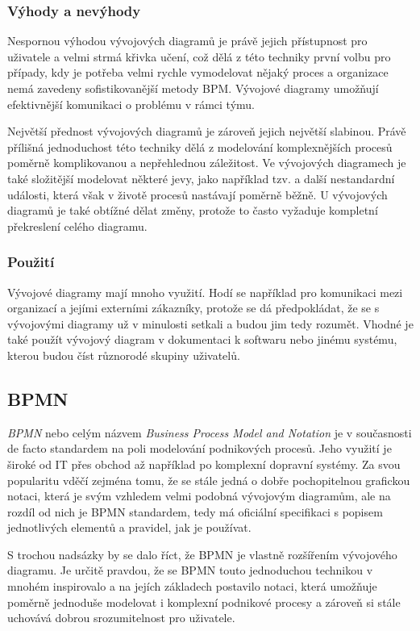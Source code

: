 \subsubsection{Výhody a nevýhody}
Nespornou výhodou vývojových diagramů je právě jejich přístupnost pro uživatele a velmi strmá křivka učení, což dělá z této techniky první volbu pro případy, kdy je potřeba velmi rychle vymodelovat nějaký proces a organizace nemá zavedeny sofistikovanější metody BPM. Vývojové diagramy umožňují efektivnější komunikaci o problému v rámci týmu. 

Největší přednost vývojových diagramů je zároveň jejich největší slabinou. Právě přílišná jednoduchost této techniky dělá z modelování komplexnějších procesů poměrně komplikovanou a nepřehlednou záležitost. Ve vývojových diagramech je také složitější modelovat některé jevy, jako například tzv.  a další nestandardní události, která však v životě procesů nastávají poměrně běžně. U vývojových diagramů je také obtížné dělat změny, protože to často vyžaduje kompletní překreslení celého diagramu.

\subsubsection{Použití}
Vývojové diagramy mají mnoho využití. Hodí se například pro komunikaci mezi organizací a jejími externími zákazníky, protože se dá předpokládat, že se s vývojovými diagramy už v minulosti setkali a budou jim tedy rozumět. Vhodné je také použít vývojový diagram v dokumentaci k softwaru nebo jinému systému, kterou budou číst různorodé skupiny uživatelů.

\subsection{BPMN}
\textit{BPMN} nebo celým názvem \textit{Business Process Model and Notation} je v současnosti de facto standardem na poli modelování podnikových procesů. Jeho využití je široké od IT přes obchod až například po komplexní dopravní systémy. Za svou popularitu vděčí zejména tomu, že se stále jedná o dobře pochopitelnou grafickou notaci, která je svým vzhledem velmi podobná vývojovým diagramům, ale na rozdíl od nich je BPMN standardem, tedy má oficiální specifikaci s popisem jednotlivých elementů a pravidel, jak je používat.

S trochou nadsázky by se dalo říct, že BPMN je vlastně rozšířením vývojového diagramu. Je určitě pravdou, že se BPMN touto jednoduchou technikou v mnohém inspirovalo a na jejích základech postavilo notaci, která umožňuje poměrně jednoduše modelovat i komplexní podnikové procesy a zároveň si stále uchovává dobrou srozumitelnost pro uživatele.

